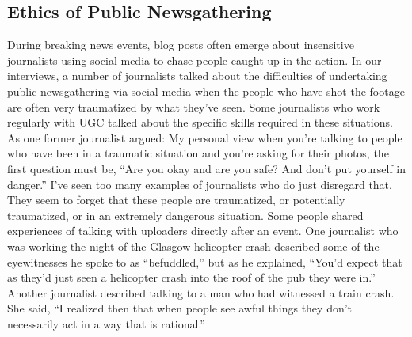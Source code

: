\begin{enumerate}
\section{Ethics of Public Newsgathering}
During breaking news events, blog posts often emerge about insensitive
journalists using social media to chase people caught up in the action. In our
interviews, a number of journalists talked about the difficulties of undertaking
public newsgathering via social media when the people who have shot
the footage are often very traumatized by what they've seen. Some journalists
who work regularly with UGC talked about the specific skills required
in these situations. As one former journalist argued:
My personal view when you're talking to people who have been in a
traumatic situation and you're asking for their photos, the first question
must be, ``Are you okay and are you safe? And don't put yourself
in danger.'' I've seen too many examples of journalists who do just disregard
that. They seem to forget that these people are traumatized,
or potentially traumatized, or in an extremely dangerous situation.
Some people shared experiences of talking with uploaders directly after an
event. One journalist who was working the night of the Glasgow helicopter
crash described some of the eyewitnesses he spoke to as ``befuddled,'' but as
he explained, ``You'd expect that as they'd just seen a helicopter crash into
the roof of the pub they were in.'' Another journalist described talking to a
man who had witnessed a train crash. She said, ``I realized then that when
people see awful things they don't necessarily act in a way that is rational.''


\end{enumerate}
